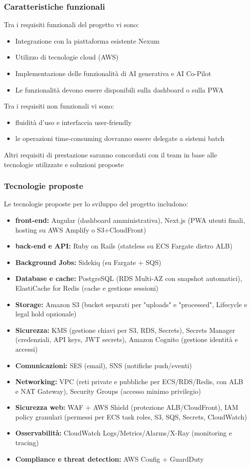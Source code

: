 \documentclass[a4paper,11pt]{article}
\begin{document}
\subsubsection{Caratteristiche funzionali}
Tra i requisiti funzionali del progetto vi sono:
\begin{itemize}[noitemsep, topsep=0pt]
 \item Integrazione con la piattaforma esistente Nexum
 \item Utilizzo di tecnologie cloud (AWS)
 \item Implementazione delle funzionalità di AI generativa e AI Co-Pilot
 \item Le funzionalità devono essere disponibili sulla dashboard o sulla PWA
\end{itemize}
Tra i requisiti non funzionali vi sono:
\begin{itemize}[noitemsep, topsep=0pt]
 \item fluidità d'uso e interfaccia user-friendly
 \item le operazioni time-consuming dovranno essere delegate a sistemi batch
\end{itemize}
Altri requisiti di prestazione saranno concordati con il team in base alle tecnologie utilizzate e soluzioni proposte
\subsubsection{Tecnologie proposte}
Le tecnologie proposte per lo sviluppo del progetto includono:
\begin{itemize}[noitemsep, topsep=0pt]
 \item \textbf{front-end:} Angular (dashboard amministrativa), Next.js (PWA utenti finali, hosting su AWS Amplify o S3+CloudFront)
 \item \textbf{back-end e API:} Ruby on Rails (stateless su ECS Fargate dietro ALB)
 \item \textbf{Background Jobs:} Sidekiq (su Fargate + SQS)
 \item \textbf{Database e cache:} PostgreSQL (RDS Multi-AZ con snapshot automatici), ElastiCache for Redis (cache e gestione sessioni)
 \item \textbf{Storage:} Amazon S3 (bucket separati per "uploads" e "processed", Lifecycle e legal hold opzionale)
 \item \textbf{Sicurezza:} KMS (gestione chiavi per S3, RDS, Secrets), Secrets Manager (credenziali, API keys, JWT secrets), Amazon Cognito (gestione identità e accessi)
 \item \textbf{Comunicazioni:} SES (email), SNS (notifiche push/eventi)
 \item \textbf{Networking:} VPC (reti private e pubbliche per ECS/RDS/Redis, con ALB e NAT Gateway), Security Groups (accesso minimo privilegio)
 \item \textbf{Sicurezza web:} WAF + AWS Shield (protezione ALB/CloudFront), IAM policy granulari (permessi per ECS task roles, S3, SQS, Secrets, CloudWatch)
 \item \textbf{Osservabilità:} CloudWatch Logs/Metrics/Alarms/X-Ray (monitoring e tracing)
 \item \textbf{Compliance e threat detection:} AWS Config + GuardDuty
\end{itemize}
\end{document}
